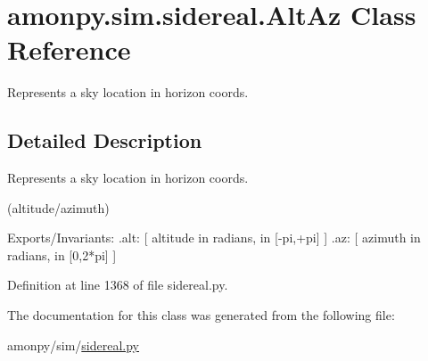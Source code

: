 \hypertarget{classamonpy_1_1sim_1_1sidereal_1_1_alt_az}{\section{amonpy.\-sim.\-sidereal.\-Alt\-Az Class Reference}
\label{classamonpy_1_1sim_1_1sidereal_1_1_alt_az}
}


Represents a sky location in horizon coords.  




\subsection{Detailed Description}
Represents a sky location in horizon coords. 

(altitude/azimuth) \begin{DoxyVerb}  Exports/Invariants:
    .alt:   [ altitude in radians, in [-pi,+pi] ]
    .az:    [ azimuth in radians, in [0,2*pi] ]\end{DoxyVerb}
 

Definition at line 1368 of file sidereal.\-py.



The documentation for this class was generated from the following file\-:\begin{DoxyCompactItemize}
\item 
amonpy/sim/\hyperlink{sidereal_8py}{sidereal.\-py}\end{DoxyCompactItemize}
